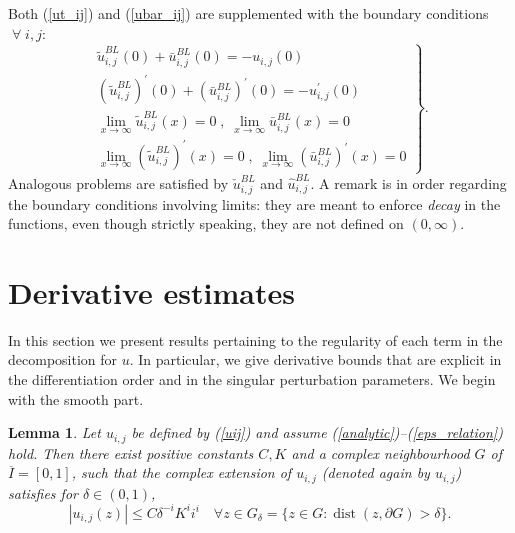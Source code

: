 \documentclass[12pt]{article}
\newtheorem{lemma}[theorem]{Lemma}
\begin{document}
%
Both (\ref{ut_ij}) and (\ref{ubar_ij}) are supplemented with the boundary
conditions$\;\forall \;i,j:$
%
\begin{equation}
\left. 
\begin{array}{c}
\tilde{u}^{BL}_{i,j}(0)+\bar{u}^{BL}_{i,j}(0)=-u_{i,j}(0) \\ 
\left(\tilde{u}^{BL}_{i,j}\right)^{\prime }(0)+\left(\bar{u}^{BL}_{i,j}\right)^{\prime }(0)=-u_{i,j}^{\prime }(0)
\\ 
\lim_{x\rightarrow \infty }\tilde{u}^{BL}_{i,j}(x)=0 \; , \; \lim_{x\rightarrow \infty }\bar{u}^{BL}_{i,j}(x)=0 \\
\lim_{x\rightarrow \infty }\left(\tilde{u}^{BL}_{i,j}\right)^{\prime }(x)=0 \; , \; \lim_{x\rightarrow \infty }\left(\bar{u}^{BL}_{i,j}\right)^{\prime }(x)=0
\end{array}
%
\right\} .  \label{bcBL}
\end{equation}
%
Analogous problems are satisfied by $\check{u}^{BL}_{i,j}$ and $\hat{u}^{BL}_{i,j}$. A remark is in order regarding the boundary conditions involving limits: they are meant to enforce \emph{decay} in the functions, even though strictly speaking, they are not defined on $(0, \infty)$.

\section{Derivative estimates\label{erranal}}

In this section we present results pertaining to the regularity of each term
in the decomposition for $u$. In particular, we give derivative bounds that
are explicit in the differentiation order and in the singular perturbation
parameters. We begin with the smooth part.

\begin{lemma}\label{lem:complex}
Let $u_{i,j}$ be defined by (\ref{uij}) and assume  (\ref{analytic})--(\ref{eps_relation}) hold. Then there exist positive constants $C,K$ and a complex neighbourhood $G$ of $\overline{I}=[0,1]$, such that the complex extension of 
$u_{i,j}$ (denoted again by $u_{i,j}$) satisfies for $\delta \in (0,1)$, 
%
\begin{equation}
\left|u_{i, j}(z)\right| \leq C \delta^{-i} K^i i^i \quad \forall z \in G_\delta=\{z \in G: \operatorname{dist}(z, \partial G)>\delta\} .
\end{equation}
%
\end{lemma}
\end{document}
